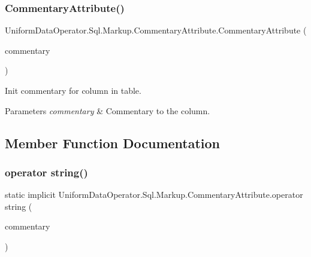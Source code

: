 \subsubsection{\texorpdfstring{Commentary\+Attribute()}{CommentaryAttribute()}}
{\footnotesize\ttfamily Uniform\+Data\+Operator.\+Sql.\+Markup.\+Commentary\+Attribute.\+Commentary\+Attribute (\begin{DoxyParamCaption}\item[{string}]{commentary }\end{DoxyParamCaption})}



Init commentary for column in table. 


\begin{DoxyParams}{Parameters}
{\em commentary} & Commentary to the column.\\
\hline
\end{DoxyParams}


\subsection{Member Function Documentation}
\mbox{\label{class_uniform_data_operator_1_1_sql_1_1_markup_1_1_commentary_attribute_a7bf4b9cbf59270e66700f7c2468ccb00}} 
\subsubsection{\texorpdfstring{operator string()}{operator string()}}
{\footnotesize\ttfamily static implicit Uniform\+Data\+Operator.\+Sql.\+Markup.\+Commentary\+Attribute.\+operator string (\begin{DoxyParamCaption}\item[{\mbox{\hyperlink{class_uniform_data_operator_1_1_sql_1_1_markup_1_1_commentary_attribute}{Commentary\+Attribute}}}]{commentary }\end{DoxyParamCaption})\hspace{0.3cm}{\ttfamily [static]}}




